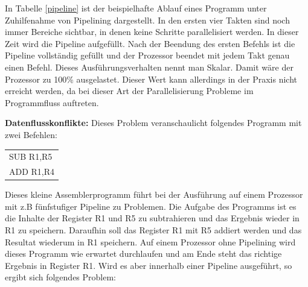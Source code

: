 \documentclass[a4paper,12pt]{article}
\begin{document}
\noindent In Tabelle \ref{pipeline} ist der beispielhafte Ablauf eines Programm unter Zuhilfenahme von Pipelining dargestellt. In den ersten vier Takten sind noch immer Bereiche sichtbar, in denen keine Schritte parallelisiert werden. In dieser Zeit wird die Pipeline aufgefüllt. Nach der Beendung des ersten Befehls ist die Pipeline vollständig gefüllt und der Prozessor beendet mit jedem Takt genau einen Befehl. Dieses Ausführungsverhalten nennt man Skalar. Damit wäre der Prozessor zu 100\% ausgelastet. Dieser Wert kann allerdings in der Praxis nicht erreicht werden, da bei dieser Art der Parallelisierung Probleme im Programmfluss auftreten.

\par\bigskip\noindent\textbf{Datenflusskonflikte:} Dieses Problem veranschaulicht folgendes Programm mit zwei Befehlen: 

\begin{table}[!htb]
\centering
\label{confliktProgramm}
\begin{tabular}{l}
SUB R1,R5 \\
ADD R1,R4
\end{tabular}
\end{table}

\noindent Dieses kleine Assemblerprogramm führt bei der Ausführung auf einem Prozessor mit z.B fünfstufiger Pipeline zu Problemen. Die Aufgabe des Programms ist es die Inhalte der Register R1 und R5 zu subtrahieren und das Ergebnis wieder in R1 zu speichern. Daraufhin soll das Register R1 mit R5 addiert werden und das Resultat wiederum in R1 speichern. Auf einem Prozessor ohne Pipelining wird dieses Programm wie erwartet durchlaufen und am Ende steht das richtige Ergebnis in Register R1. Wird es aber innerhalb einer Pipeline ausgeführt, so ergibt sich folgendes Problem:
\end{document}

